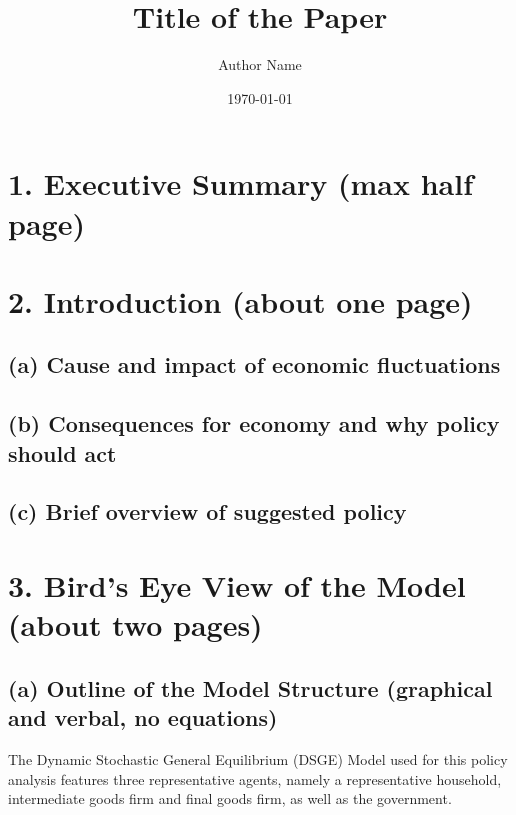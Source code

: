 \documentclass[12pt]{article}
\title{Title of the Paper}
\author{Author Name}
\date{\today}
\begin{document}
\maketitle
\section*{1. Executive Summary (max half page)}

\section*{2. Introduction (about one page)}
\subsection*{(a) Cause and impact of economic fluctuations}

\subsection*{(b) Consequences for economy and why policy should act}

\subsection*{(c) Brief overview of suggested policy}




\section*{3. Bird’s Eye View of the Model (about two pages)}

\subsection*{(a) Outline of the Model Structure (graphical and verbal, no equations)}
The Dynamic Stochastic General Equilibrium (DSGE) Model used for this policy analysis features
three representative agents, namely a representative household, intermediate goods firm and final goods firm, 
as well as the government. 
\end{document}
